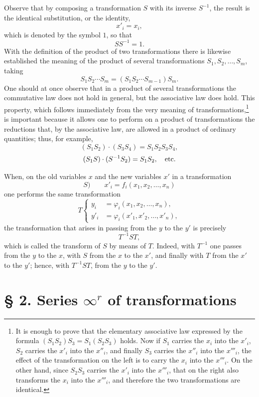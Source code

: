 \documentclass[11pt]{book}
\begin{document}
Observe that by composing a transformation $S$ with its inverse $S^{-1}$, the result is the identical substitution, or the identity,
\[
 x'_i=x_i,
\]
which is denoted by the symbol $1$, so that
\[
 SS^{-1}=1.
\]
With the definition of the product of two transformations there is likewise established the meaning of the product of several transformations $S_1,S_2,\ldots,S_m$, taking
\[
 S_1S_2\cdots S_m=(S_1S_2\cdots S_{m-1})S_m.
\]
One should at once observe that in a product of several transformations the commutative law does not hold in general, but the associative law does hold. This property, which follows immediately from the very meaning of transformations,\footnote{It is enough to prove that the elementary associative law expressed by the formula $(S_1S_2)S_3=S_1(S_2S_3)$ holds. Now if $S_1$ carries the $x_i$ into the $x'_i$, $S_2$ carries the $x'_i$ into the $x''_i$, and finally $S_3$ carries the $x''_i$ into the $x'''_i$, the effect of the transformation on the left is to carry the $x_i$ into the $x'''_i$. On the other hand, since $S_2S_3$ carries the $x'_i$ into the $x'''_i$, that on the right also transforms the $x_i$ into the $x'''_i$, and therefore the two transformations are identical.} is important because it allows one to perform on a product of transformations the reductions that, by the associative law, are allowed in a product of ordinary quantities; thus, for example,
\[
 (S_1S_2)\cdot(S_3S_4)=S_1S_2S_3S_4,
\]
\[
 (S_1S)\cdot(S^{-1}S_2)=S_1S_2,\quad\hbox{etc.}
\]

When, on the old variables $x$ and the new variables $x'$ in a transformation
\[
 S)\qquad x'_i=f_i(x_1,x_2,\ldots,x_n)
\]
one performs the same transformation
\[
T\left\{
\begin{aligned}
 y_i&=\varphi_i(x_1,x_2,\ldots,x_n),\\
 y'_i&=\varphi_i(x'_1,x'_2,\ldots,x'_n),
\end{aligned}
\right.
\]
the transformation that arises in passing from the $y$ to the $y'$ is precisely
\[
 T^{-1}ST,
\]
which is called the transform of $S$ by means of $T$. Indeed, with $T^{-1}$ one passes from the $y$ to the $x$, with $S$ from the $x$ to the $x'$, and finally with $T$ from the $x'$ to the $y'$; hence, with $T^{-1}ST$, from the $y$ to the $y'$.

\section*{\S{} 2. Series $\infty^r$ of transformations}
\end{document}
